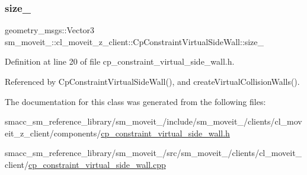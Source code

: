 \subsubsection{\texorpdfstring{size\+\_\+}{size\_}}
{\footnotesize\ttfamily geometry\+\_\+msgs\+::\+Vector3 sm\+\_\+moveit\+\_\+::cl\+\_\+moveit\+\_\+z\+\_\+client\+::\+Cp\+Constraint\+Virtual\+Side\+Wall\+::size\+\_\+\hspace{0.3cm}{\ttfamily [private]}}



Definition at line 20 of file cp\+\_\+constraint\+\_\+virtual\+\_\+side\+\_\+wall.\+h.



Referenced by Cp\+Constraint\+Virtual\+Side\+Wall(), and create\+Virtual\+Collision\+Walls().



The documentation for this class was generated from the following files\+:\begin{DoxyCompactItemize}
\item 
smacc\+\_\+sm\+\_\+reference\+\_\+library/sm\+\_\+moveit\+\_/include/sm\+\_\+moveit\+\_/clients/cl\+\_\+moveit\+\_\+z\+\_\+client/components/\hyperlink{cp__constraint__virtual__side__wall_8h}{cp\+\_\+constraint\+\_\+virtual\+\_\+side\+\_\+wall.\+h}\item 
smacc\+\_\+sm\+\_\+reference\+\_\+library/sm\+\_\+moveit\+\_/src/sm\+\_\+moveit\+\_/clients/cl\+\_\+moveit\+\_\+client/\hyperlink{cp__constraint__virtual__side__wall_8cpp}{cp\+\_\+constraint\+\_\+virtual\+\_\+side\+\_\+wall.\+cpp}\end{DoxyCompactItemize}
